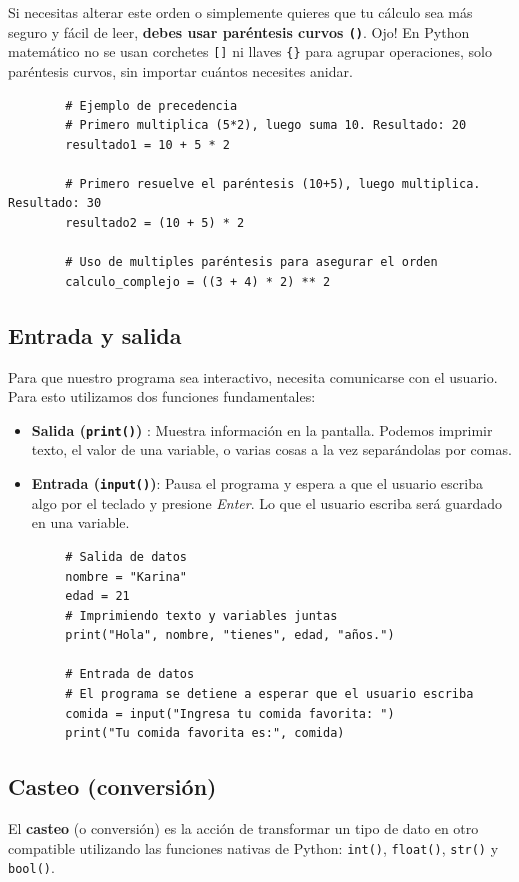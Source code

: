 \documentclass[11pt, a4paper]{article}
\begin{document}
	Si necesitas alterar este orden o simplemente quieres que tu cálculo sea más seguro y fácil de leer, \textbf{debes usar paréntesis curvos \texttt{()}}. Ojo! En Python matemático no se usan corchetes \texttt{[]} ni llaves \texttt{\{\}} para agrupar operaciones, solo paréntesis curvos, sin importar cuántos necesites anidar.
	
	\begin{lstlisting}
		# Ejemplo de precedencia
		# Primero multiplica (5*2), luego suma 10. Resultado: 20
		resultado1 = 10 + 5 * 2   
		
		# Primero resuelve el paréntesis (10+5), luego multiplica. Resultado: 30
		resultado2 = (10 + 5) * 2 
		
		# Uso de multiples paréntesis para asegurar el orden
		calculo_complejo = ((3 + 4) * 2) ** 2
	\end{lstlisting}
	
	\subsection{Entrada y salida}
	Para que nuestro programa sea interactivo, necesita comunicarse con el usuario. Para esto utilizamos dos funciones fundamentales:
	
	\begin{itemize}
		\item \textbf{Salida (\texttt{print()})} : Muestra información en la pantalla. Podemos imprimir texto, el valor de una variable, o varias cosas a la vez separándolas por comas.
		
		\item \textbf{Entrada (\texttt{input()})}: Pausa el programa y espera a que el usuario escriba algo por el teclado y presione \textit{Enter}. Lo que el usuario escriba será guardado en una variable.
	\end{itemize}
	
	\begin{lstlisting}
		# Salida de datos
		nombre = "Karina"
		edad = 21
		# Imprimiendo texto y variables juntas
		print("Hola", nombre, "tienes", edad, "años.")
		
		# Entrada de datos
		# El programa se detiene a esperar que el usuario escriba
		comida = input("Ingresa tu comida favorita: ")
		print("Tu comida favorita es:", comida)
	\end{lstlisting}
	
	\newpage
	
	\subsection{Casteo (conversión)}
	El \textbf{casteo} (o conversión) es la acción de transformar un tipo de dato en otro compatible utilizando las funciones nativas de Python: \texttt{int()}, \texttt{float()}, \texttt{str()} y \texttt{bool()}.
	
\end{document}
